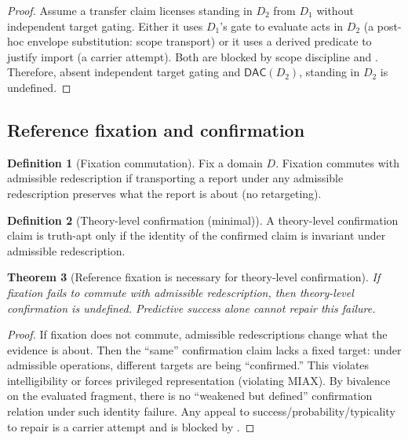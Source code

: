 \documentclass[11pt]{article}
\newtheorem{theorem}{Theorem}[section]
\theoremstyle{definition}
\newtheorem{definition}[theorem]{Definition}
\newcommand{\DAC}{\mathsf{DAC}}
\begin{document}
\begin{proof}
Assume a transfer claim licenses standing in $D_2$ from $D_1$ without independent target gating.
Either it uses $D_1$'s gate to evaluate acts in $D_2$ (a post-hoc envelope substitution: scope transport) or it uses a derived predicate to justify import (a carrier attempt).
Both are blocked by scope discipline and .
Therefore, absent independent target gating and $\DAC(D_2)$, standing in $D_2$ is undefined.
\end{proof}

\subsection{Reference fixation and confirmation}

\begin{definition}[Fixation commutation]
Fix a domain $D$.
Fixation commutes with admissible redescription if transporting a report under any admissible redescription preserves what the report is about (no retargeting).
\end{definition}

\begin{definition}[Theory-level confirmation (minimal)]
A theory-level confirmation claim is truth-apt only if the identity of the confirmed claim is invariant under admissible redescription.
\end{definition}

\begin{theorem}[Reference fixation is necessary for theory-level confirmation]
\label{thm:fixation}
If fixation fails to commute with admissible redescription, then theory-level confirmation is undefined.
Predictive success alone cannot repair this failure.
\end{theorem}

\begin{proof}
If fixation does not commute, admissible redescriptions change what the evidence is about.
Then the ``same'' confirmation claim lacks a fixed target: under admissible operations, different targets are being ``confirmed.''
This violates intelligibility or forces privileged representation (violating MIAX).
By bivalence on the evaluated fragment, there is no ``weakened but defined'' confirmation relation under such identity failure.
Any appeal to success/probability/typicality to repair is a carrier attempt and is blocked by .
\end{proof}
\end{document}
